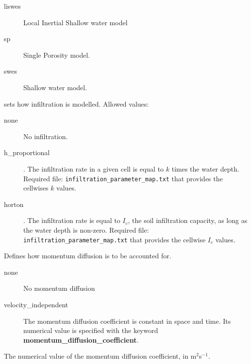 \begin{description}
\begin{description}
  \item [liswes]   Local Inertial Shallow water model  
   \item[sp]  Single Porosity model.
    \item[swes] Shallow water model.
\end{description}
%
\item [model\_infiltration] 
sets how infiltration is modelled. Allowed values:
\begin{description}
	\item [none] No infiltration.
	\item [h\_proportional]. The infiltration rate in a given cell is equal to $k$ times the water depth. Required file: \texttt{infiltration\_parameter\_map.txt} that provides the cellwises $k$ values.
	\item [horton]. The infiltration rate is equal to $I_c$, the soil infiltration capacity, as long as the water depth is non-zero. Required file: \texttt{infiltration\_parameter\_map.txt} that provides the cellwise $I_c$ values.
\end{description}
%
\item [model\_momentum\_diffusion]  
Defines how momentum diffusion is to be accounted for.
\begin{description}
\item [none] No momentum diffusion
\item [velocity\_independent] The momentum diffusion coefficient is constant in space and time. Its numerical value is specified with the keyword \textbf{momentum\_diffusion\_coefficient}.
\end{description}
%
\item [model\_momentum\_diffusion\_coefficient]  
The numerical value of the momentum diffusion coefficient, in m$^2$s$^{-1}$.
%
%


\end{description}
